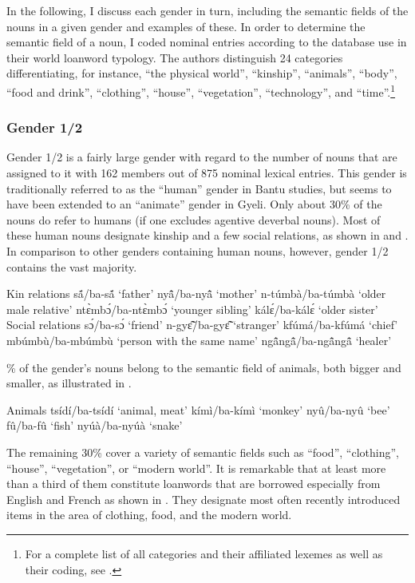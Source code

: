 In the following, I discuss each gender in turn, including the semantic fields of the nouns in a given gender and examples of these. In order to determine the semantic field of a noun, I coded nominal entries according to the database \citet{haspelmath2009} use in their world loanword typology. The authors distinguish 24 categories differentiating, for instance, ``the physical world'', ``kinship'', ``animals'', ``body'', ``food and drink'', ``clothing'', ``house'', ``vegetation'', ``technology'', and ``time''.\footnote{For a complete list of all categories and their affiliated lexemes as well as their coding, see \citet[22-34]{haspelmath2009}.}

\largerpage
\subsubsection{Gender 1/2} 
\label{sec:1/2}

Gender 1/2  is a fairly large gender with regard to the number of nouns that are assigned to it with 162 members out of 875 nominal lexical entries. This gender is traditionally referred to as the ``human'' gender in Bantu studies, but seems to have been extended to an ``animate'' gender in Gyeli.  Only about 30\% of the nouns do refer to humans (if one excludes agentive deverbal nouns). Most of these human nouns designate kinship and a few social relations, as shown in  and . In comparison to other genders containing human nouns, however, gender 1/2 contains the vast majority.

\ea\label{1/2kin} Kin relations
\ea sã́/ba-sã́ `father'
\ex nyã̂/ba-nyã̂ `mother'
\ex n-túmbà/ba-túmbà `older male relative'
\ex ntɛ̀mbɔ́/ba-ntɛ̀mbɔ́ `younger sibling'
\ex kálɛ́/ba-kálɛ́ `older sister'
\z
\ex\label{1/2soc} Social relations
\ea sɔ́/ba-sɔ́ `friend'
\ex n-gyɛ̃̂/ba-gyɛ̃̂ `stranger'
\ex kfúmá/ba-kfúmá `chief'
\ex mbúmbù/ba-mbúmbù `person with the same name'
\ex ngã̂ngã̂/ba-ngã̂ngã̂ `healer'
\z
\z

\% of the gender's nouns belong to the semantic field of animals, both bigger and smaller, as illustrated in .

\ea\label{1/2animals} Animals
\ea tsídí/ba-tsídí `animal, meat'
\ex kímì/ba-kímì `monkey'
\ex nyû/ba-nyû `bee'
\ex fû/ba-fû `fish'
\ex nyúà/ba-nyúà `snake'
\z
\z

\noindent  The remaining 30\% cover a variety of semantic fields such as ``food'', ``clothing'', ``house'', ``vegetation'', or ``modern world''. It is remarkable that at least more than a third of them constitute loanwords that are borrowed especially from English and French as shown in . They designate most often recently introduced items in the area of clothing, food, and the modern world.


